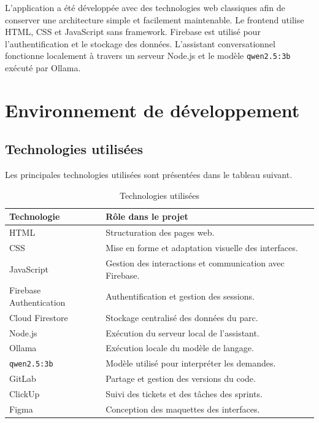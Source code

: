 \documentclass{rapportENSIAS}
\begin{document}
L’application a été développée avec des technologies web classiques afin de conserver une architecture simple et facilement maintenable. Le frontend utilise HTML, CSS et JavaScript sans framework. Firebase est utilisé pour l’authentification et le stockage des données. L’assistant conversationnel fonctionne localement à travers un serveur Node.js et le modèle \texttt{qwen2.5:3b} exécuté par Ollama.

\section{Environnement de développement}

\subsection{Technologies utilisées}

Les principales technologies utilisées sont présentées dans le tableau suivant.

\begin{table}[htbp]
    \centering
    \caption{Technologies utilisées}
    \label{tab:technologies}
    \begin{tabular}{|p{4cm}|p{8cm}|}
        \hline
        \textbf{Technologie} & \textbf{Rôle dans le projet} \\
        \hline
        HTML & Structuration des pages web. \\
        \hline
        CSS & Mise en forme et adaptation visuelle des interfaces. \\
        \hline
        JavaScript & Gestion des interactions et communication avec Firebase. \\
        \hline
        Firebase Authentication & Authentification et gestion des sessions. \\
        \hline
        Cloud Firestore & Stockage centralisé des données du parc. \\
        \hline
        Node.js & Exécution du serveur local de l'assistant. \\
        \hline
        Ollama & Exécution locale du modèle de langage. \\
        \hline
        \texttt{qwen2.5:3b} & Modèle utilisé pour interpréter les demandes. \\
        \hline
        GitLab & Partage et gestion des versions du code. \\
        \hline
        ClickUp & Suivi des tickets et des tâches des sprints. \\
        \hline
        Figma & Conception des maquettes des interfaces. \\
        \hline
    \end{tabular}
\end{table}
\end{document}

